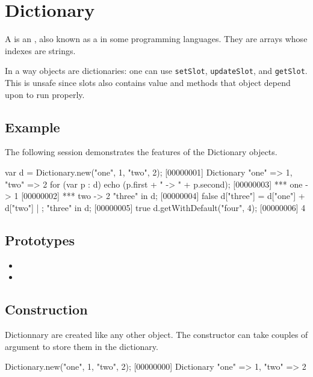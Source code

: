 \section{Dictionary}

A  is an , also known as a
 in some programming languages.  They are arrays whose
indexes are strings.

In a way objects are dictionaries: one can use \lstinline|setSlot|,
\lstinline|updateSlot|, and \lstinline|getSlot|.  This is unsafe since
slots also contains value and methods that object depend upon to run
properly.

\subsection{Example}

The following session demonstrates the features of the Dictionary
objects.

\begin{urbiscript}
var d = Dictionary.new("one", 1, "two", 2);
[00000001] Dictionary {"one" => 1, "two" => 2}
for (var p : d)
  echo (p.first + " -> " + p.second);
[00000003] *** one -> 1
[00000002] *** two -> 2
"three" in d;
[00000004] false
d["three"] = d["one"] + d["two"] | {};
"three" in d;
[00000005] true
d.getWithDefault("four", 4);
[00000006] 4
\end{urbiscript}


\subsection{Prototypes}

\begin{itemize}
\item {}
\item {}
\end{itemize}

\subsection{Construction}

Dictionnary are created like any other object. The constructor can
take couples of argument to store them in the dictionary.

\begin{urbiscript}[firstnumber=last]
Dictionary.new("one", 1, "two", 2);
[00000000] Dictionary {"one" => 1, "two" => 2}
\end{urbiscript}


